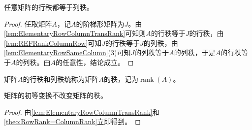 \begin{theorem}\label{theo:RowRank=ColumnRank}
	任意矩阵的行秩都等于列秩。
\end{theorem}
\begin{proof}
	任取矩阵$A$，记$A$的阶梯形矩阵为$J$。由\cref{lem:ElementaryRowColumnTransRank}可知则$A$的行秩等于$J$的行秩，由\cref{lem:REFRankColumnRow}可知$J$的行秩等于$J$的列秩，由\cref{lem:ElementaryRowSameColumn}(3)可知$J$的列秩等于$A$的列秩，于是$A$的行秩等于$A$的列秩。由$A$的任意性，结论成立。
\end{proof}
\begin{definition}
	矩阵$A$的行秩和列秩统称为矩阵$A$的秩，记为$\operatorname{rank}(A)$。
\end{definition}
\begin{corollary}
	矩阵的初等变换不改变矩阵的秩。
\end{corollary}
\begin{proof}
	由\cref{lem:ElementaryRowColumnTransRank}和\cref{theo:RowRank=ColumnRank}立即得到。
\end{proof}

